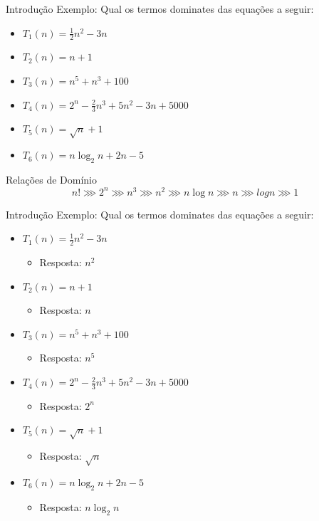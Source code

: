 \documentclass[aspectratio=169]{beamer}
\begin{document}
\begin{frame}{Introdução}
Exemplo: Qual os termos dominates das equações a seguir:
\begin{itemize}
\item $T_1(n) = \frac{1}{2} n^2 - 3n$
\item $T_2(n) = n + 1$
\item $T_3(n) = n^5 + n^3 + 100$
\item $T_4(n) = 2^n - \frac{2}{3} n^3 + 5 n^2 - 3 n + 5000$
\item $T_5(n) = \sqrt{ n } + 1$
\item $T_6(n) = n \log_2 n + 2n - 5$
\end{itemize}

\begin{block}{Relações de Domínio}
\begin{equation}
n! \ggg 2^n  \ggg n^3 \ggg n^2 \ggg n \log n \ggg n \ggg log n \ggg 1 \nonumber
\end{equation}
\end{block}

\end{frame}


\begin{frame}{Introdução}
Exemplo: Qual os termos dominates das equações a seguir:
\begin{itemize}
\item $T_1(n) = \frac{1}{2} n^2 - 3n$ 
\begin{itemize}
\item Resposta: $n^2$
\end{itemize}
\item $T_2(n) = n + 1$  
\begin{itemize}
\item Resposta: $n$
\end{itemize}
\item $T_3(n) = n^5 + n^3 + 100$  
\begin{itemize}
\item Resposta: $n^5$
\end{itemize}
\item $T_4(n) = 2^n - \frac{2}{3} n^3 + 5 n^2 - 3 n + 5000$  
\begin{itemize}
\item Resposta: $2^n$
\end{itemize}
\item $T_5(n) = \sqrt{ n } + 1$
\begin{itemize}
\item Resposta: $\sqrt{n}$
\end{itemize}
\item $T_6(n) = n \log_2 n  + 2n - 5$
\begin{itemize}
\item Resposta: $n \log_2 n$
\end{itemize}
\end{itemize}
\end{frame}
\end{document}
